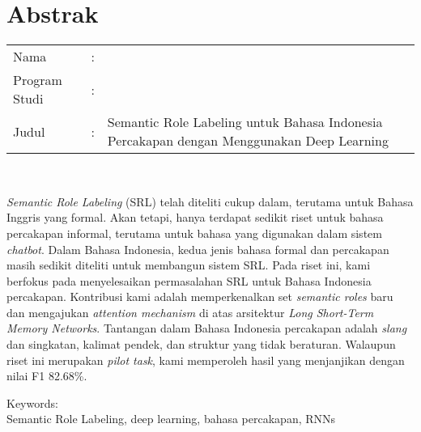 %
%
%

\chapter*{Abstrak}

\vspace*{0.2cm}

\noindent \begin{tabular}{l l p{10cm}}
	Nama&: & \penulis \\
	Program Studi&: & \program \\
	Judul&: & Semantic Role Labeling untuk Bahasa Indonesia Percakapan dengan Menggunakan Deep Learning \\
\end{tabular} \\ 

\vspace*{0.5cm}

\noindent 

\textit{Semantic Role Labeling} (SRL) telah diteliti cukup dalam, terutama untuk Bahasa Inggris yang formal. Akan tetapi, hanya terdapat sedikit riset untuk bahasa percakapan informal, terutama untuk bahasa yang digunakan dalam sistem \textit{chatbot}. Dalam Bahasa Indonesia, kedua jenis bahasa formal dan percakapan masih sedikit diteliti untuk membangun sistem SRL. Pada riset ini, kami berfokus pada menyelesaikan permasalahan SRL untuk Bahasa Indonesia percakapan. Kontribusi kami adalah memperkenalkan set \textit{semantic roles} baru dan mengajukan \textit{attention mechanism} di atas arsitektur \textit{Long Short-Term Memory Networks}. Tantangan dalam Bahasa Indonesia percakapan adalah \textit{slang} dan singkatan, kalimat pendek, dan struktur yang tidak beraturan. Walaupun riset ini merupakan \textit{pilot task}, kami memperoleh hasil yang menjanjikan dengan nilai F1 82.68\%.


\vspace*{0.2cm}

\noindent Keywords: \\ 
\noindent Semantic Role Labeling, deep learning, bahasa percakapan, RNNs \\ 

\newpage